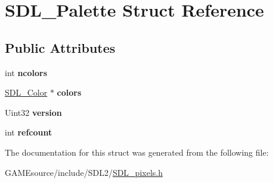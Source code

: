 \hypertarget{struct_s_d_l___palette}{}\section{S\+D\+L\+\_\+\+Palette Struct Reference}
\label{struct_s_d_l___palette}
\subsection*{Public Attributes}
\begin{DoxyCompactItemize}
\item 
\mbox{\label{struct_s_d_l___palette_a81a0cc3197480e994c6b06f1f0567091}} 
int {\bfseries ncolors}
\item 
\mbox{\label{struct_s_d_l___palette_ad757a50037f43533196e94942440b241}} 
\mbox{\hyperlink{struct_s_d_l___color}{S\+D\+L\+\_\+\+Color}} $\ast$ {\bfseries colors}
\item 
\mbox{\label{struct_s_d_l___palette_a5b8d45519f6850a32f13f1602ce37a8e}} 
Uint32 {\bfseries version}
\item 
\mbox{\label{struct_s_d_l___palette_a35c667737f883f973bb0a8dea143b08d}} 
int {\bfseries refcount}
\end{DoxyCompactItemize}


The documentation for this struct was generated from the following file\+:\begin{DoxyCompactItemize}
\item 
G\+A\+M\+Esource/include/\+S\+D\+L2/\mbox{\hyperlink{_s_d_l__pixels_8h}{S\+D\+L\+\_\+pixels.\+h}}\end{DoxyCompactItemize}
